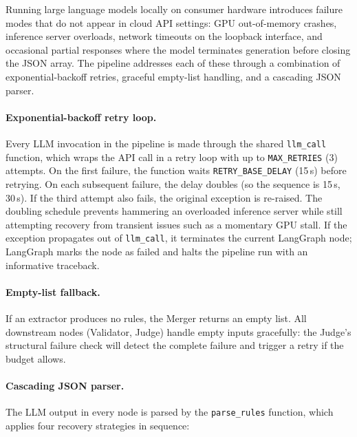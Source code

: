 ﻿\documentclass[11pt]{article}
\begin{document}
Running large language models locally on consumer hardware introduces failure modes
that do not appear in cloud API settings: GPU out-of-memory crashes, inference
server overloads, network timeouts on the loopback interface, and occasional
partial responses where the model terminates generation before closing the JSON
array.  The pipeline addresses each of these through a combination of
exponential-backoff retries, graceful empty-list handling, and a cascading JSON
parser.

\paragraph{Exponential-backoff retry loop.}
Every LLM invocation in the pipeline is made through the shared \texttt{llm\_call}
function, which wraps the API call in a retry loop with up to \texttt{MAX\_RETRIES}
(3) attempts.  On the first failure, the function waits \texttt{RETRY\_BASE\_DELAY}
(15\,s) before retrying.  On each subsequent failure, the delay doubles (so the
sequence is 15\,s, 30\,s).  If the third attempt also fails, the original exception
is re-raised.  The doubling schedule prevents hammering an overloaded inference
server while still attempting recovery from transient issues such as a momentary
GPU stall.  If the exception propagates out of \texttt{llm\_call}, it terminates the
current LangGraph node; LangGraph marks the node as failed and halts the pipeline
run with an informative traceback.

\paragraph{Empty-list fallback.}
If an extractor produces no rules, the Merger returns an empty list.  All
downstream nodes (Validator, Judge) handle empty inputs gracefully: the Judge's
structural failure check will detect the complete failure and trigger a retry if
the budget allows.

\paragraph{Cascading JSON parser.}
The LLM output in every node is parsed by the \texttt{parse\_rules} function,
which applies four recovery strategies in sequence:
\end{document}
